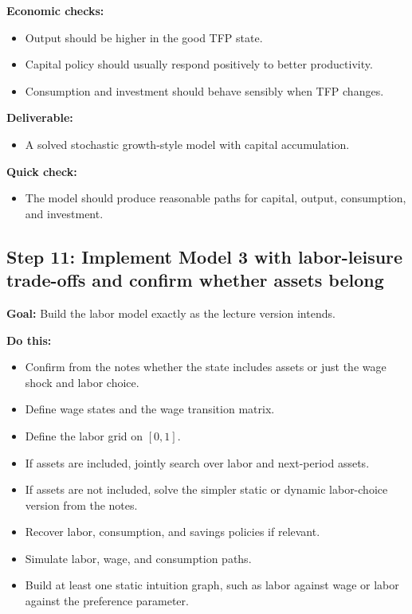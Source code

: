 \documentclass[11pt]{article}
\begin{document}
\textbf{Economic checks:}
\begin{itemize}
    \item Output should be higher in the good TFP state.
    \item Capital policy should usually respond positively to better productivity.
    \item Consumption and investment should behave sensibly when TFP changes.
\end{itemize}

\textbf{Deliverable:}
\begin{itemize}
    \item A solved stochastic growth-style model with capital accumulation.
\end{itemize}

\textbf{Quick check:}
\begin{itemize}
    \item The model should produce reasonable paths for capital, output, consumption, and investment.
\end{itemize}

\subsection{Step 11: Implement Model 3 with labor-leisure trade-offs and confirm whether assets belong}
\textbf{Goal:} Build the labor model exactly as the lecture version intends.

\textbf{Do this:}
\begin{itemize}
    \item Confirm from the notes whether the state includes assets or just the wage shock and labor choice.
    \item Define wage states and the wage transition matrix.
    \item Define the labor grid on \([0,1]\).
    \item If assets are included, jointly search over labor and next-period assets.
    \item If assets are not included, solve the simpler static or dynamic labor-choice version from the notes.
    \item Recover labor, consumption, and savings policies if relevant.
    \item Simulate labor, wage, and consumption paths.
    \item Build at least one static intuition graph, such as labor against wage or labor against the preference parameter.
\end{itemize}
\end{document}
